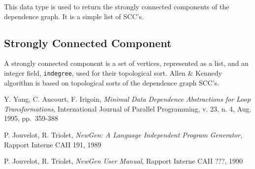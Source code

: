 \documentclass[a4paper]{article}
\begin{document}
This data type is used to return the strongly connected components of
the dependence graph. It is a simple list of SCC's.

\begin{comment}
Ce domaine permet de contenir le re'sultat de l'algorithme de calcul
des composantes fortement connexes d'un graphe. Il s'agit d'une liste de
{\tt scc}, c'est a` dire de composantes fortement connexes.
\end{comment}

\subsection{Strongly Connected Component}

{}

A strongly connected component is a set of vertices, represented as a
list, and an integer field, \verb/indegree/, used for their topological
sort. Allen \& Kennedy algorithm is based on topological sorts of the
dependence graph SCC's.

\begin{comment}
Ce domaine permet de repre'senter une composante fortement connexe d'un
graphe. Une {\tt scc} se compose d'un ensemble de noeuds, et d'un
sous-domaine {\tt indegree} utilise' par l'algorithme de tri topologique.
\end{comment}

\begin{thebibliography}{9}


 Y. Yang, C. Ancourt, F. Irigoin,
{\em Minimal Data Dependence Abstractions for Loop Transformations}, 
International Journal of Parallel Programming,
v. 23, n. 4, Aug. 1995, pp.~359-388

 P. Jouvelot, R. Triolet,
{\em NewGen: A Language Independent Program Generator},
Rapport Interne CAII 191, 1989

 P. Jouvelot, R. Triolet,
{\em NewGen User Manual},
Rapport Interne CAII ???, 1990

\end{thebibliography}
\end{document}
